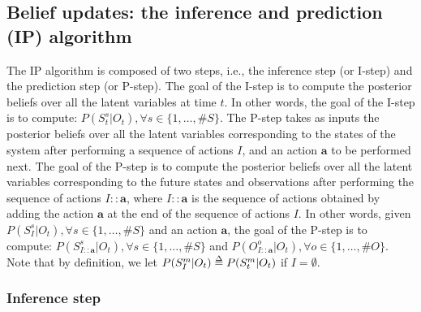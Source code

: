 \documentclass[twoside,11pt]{article}
\def\delequal{\mathrel{\ensurestackMath{\stackon[1pt]{=}{\scriptstyle\Delta}}}}
\newcommand{\nb}[1]{\# #1}
\begin{document}
\subsection{Belief updates: the inference and prediction (IP) algorithm} \label{ssec:IP_algorithm}

The IP algorithm is composed of two steps, i.e., the inference step (or I-step) and the prediction step (or P-step). The goal of the I-step is to compute the posterior beliefs over all the latent variables at time $t$. In other words, the goal of the I-step is to compute: $P(S_t^s|O_t), \forall s \in \{1, \hdots, \nb{S}\}$. The P-step takes as inputs the posterior beliefs over all the latent variables corresponding to the states of the system after performing a sequence of actions $I$, and an action $\bm{a}$ to be performed next. The goal of the P-step is to compute the posterior beliefs over all the latent variables corresponding to the future states and observations after performing the sequence of actions $I::\bm{a}$, where $I::\bm{a}$ is the sequence of actions obtained by adding the action $\bm{a}$ at the end of the sequence of actions $I$. In other words, given $P(S_I^s|O_t), \forall s \in \{1, \hdots, \nb{S}\}$ and an action $\bm{a}$, the goal of the P-step is to compute: $P(S_{I::\bm{a}}^s|O_t), \forall s \in \{1, \hdots, \nb{S}\}$ and $P(O_{I::\bm{a}}^o|O_t), \forall o \in \{1, \hdots, \nb{O}\}$. Note that by definition, we let $P(S_I^m|O_t) \delequal P(S_t^m|O_t)$ if $I = \emptyset$. 

\subsubsection{Inference step} \label{ssec:i_step}
\end{document}
